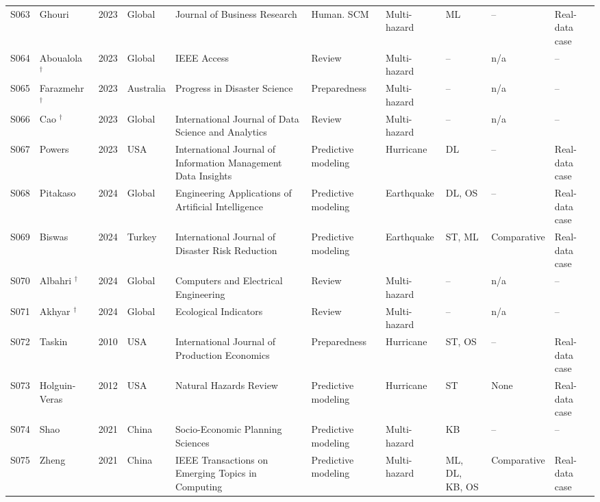 \begin{landscape}
\begin{longtable}{@{}L{0.9cm}L{2.9cm}L{0.8cm}L{2.1cm}L{3.1cm}L{2.4cm}L{2.0cm}L{1.8cm}L{2.1cm}L{2.0cm}@{}}
S063 & Ghouri \cite{Ghouri2023AnDevelopment} & 2023 & Global & Journal of Business Research & Human. SCM & Multi-hazard & ML & -- & Real-data case \\
S064 & Aboualola \cite{Aboualola2023EdgeIntegration}$^{\dagger}$ & 2023 & Global & IEEE Access & Review & Multi-hazard & -- & n/a & -- \\
S065 & Farazmehr \cite{Farazmehr2023LocatingReview}$^{\dagger}$ & 2023 & Australia & Progress in Disaster Science & Preparedness & Multi-hazard & -- & n/a & -- \\
S066 & Cao \cite{Cao2023AIResilience}$^{\dagger}$ & 2023 & Global & International Journal of Data Science and Analytics & Review & Multi-hazard & -- & n/a & -- \\
S067 & Powers \cite{Powers2023UsingApproach} & 2023 & USA & International Journal of Information Management Data Insights & Predictive modeling & Hurricane & DL & -- & Real-data case \\
S068 & Pitakaso \cite{Pitakaso2024Optimization-drivenManagement} & 2024 & Global & Engineering Applications of Artificial Intelligence & Predictive modeling & Earthquake & DL, OS & -- & Real-data case \\
S069 & Biswas \cite{Biswas2024AnTurkiye} & 2024 & Turkey & International Journal of Disaster Risk Reduction & Predictive modeling & Earthquake & ST, ML & Comparative & Real-data case \\
S070 & Albahri \cite{Albahri2024ADisasters}$^{\dagger}$ & 2024 & Global & Computers and Electrical Engineering & Review & Multi-hazard & -- & n/a & -- \\
S071 & Akhyar \cite{Akhyar2024DeepReview}$^{\dagger}$ & 2024 & Global & Ecological Indicators & Review & Multi-hazard & -- & n/a & -- \\
S072 & Taskin \cite{Taskin2010InventoryPredictions} & 2010 & USA & International Journal of Production Economics & Preparedness & Hurricane & ST, OS & -- & Real-data case \\
S073 & Holguin-Veras \cite{Holguin-Veras2012ImmediateKatrina} & 2012 & USA & Natural Hazards Review & Predictive modeling & Hurricane & ST & None & Real-data case \\
S074 & Shao \cite{Shao2021ReliefReasoning} & 2021 & China & Socio-Economic Planning Sciences & Predictive modeling & Multi-hazard & KB & -- & -- \\
S075 & Zheng \cite{Zheng2022Co-EvolutionaryForecasting} & 2021 & China & IEEE Transactions on Emerging Topics in Computing & Predictive modeling & Multi-hazard & ML, DL, KB, OS & Comparative & Real-data case \\

\end{longtable}
\end{landscape}
